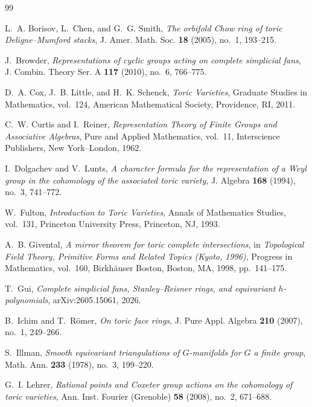 \documentclass[12pt]{amsart}
\theoremstyle{remark}
\begin{document}
\begin{thebibliography}{99}


L.~A. Borisov, L.~Chen, and G.~G. Smith,
\emph{The orbifold Chow ring of toric Deligne--Mumford stacks},
J. Amer. Math. Soc. \textbf{18} (2005), no.~1, 193--215.

J.~Browder,
\emph{Representations of cyclic groups acting on complete simplicial fans},
J. Combin. Theory Ser. A \textbf{117} (2010), no.~6, 766--775.

D.~A. Cox, J.~B. Little, and H.~K. Schenck,
\emph{Toric Varieties},
Graduate Studies in Mathematics, vol.~124,
American Mathematical Society, Providence, RI, 2011.

C.~W. Curtis and I.~Reiner,
\emph{Representation Theory of Finite Groups and Associative Algebras},
Pure and Applied Mathematics, vol.~11,
Interscience Publishers, New York--London, 1962.

I.~Dolgachev and V.~Lunts,
\emph{A character formula for the representation of a Weyl group in the
cohomology of the associated toric variety},
J. Algebra \textbf{168} (1994), no.~3, 741--772.

W.~Fulton,
\emph{Introduction to Toric Varieties},
Annals of Mathematics Studies, vol.~131,
Princeton University Press, Princeton, NJ, 1993.

A.~B. Givental,
\emph{A mirror theorem for toric complete intersections},
in \emph{Topological Field Theory, Primitive Forms and Related Topics
(Kyoto, 1996)}, Progress in Mathematics, vol.~160,
Birkh\"auser Boston, Boston, MA, 1998, pp.~141--175.

T.~Gui,
\emph{Complete simplicial fans, Stanley--Reisner rings, and equivariant
$h$-polynomials}, arXiv:2605.15061, 2026.

B.~Ichim and T.~R\"omer,
\emph{On toric face rings},
J. Pure Appl. Algebra \textbf{210} (2007), no.~1, 249--266.

S.~Illman,
\emph{Smooth equivariant triangulations of $G$-manifolds for $G$ a finite group},
 Math. Ann. \textbf{233} (1978), no.~3, 199--220.

G.~I. Lehrer,
\emph{Rational points and Coxeter group actions on the cohomology of toric
varieties},
Ann. Inst. Fourier (Grenoble) \textbf{58} (2008), no.~2, 671--688.


\end{thebibliography}
\end{document}
